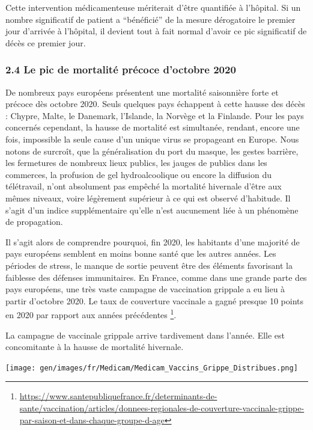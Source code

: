 \documentclass[
]{article}
\begin{document}
Cette intervention médicamenteuse mériterait d'être quantifiée à
l'hôpital. Si un nombre significatif de patient a ``bénéficié'' de la
mesure dérogatoire le premier jour d'arrivée à l'hôpital, il devient
tout à fait normal d'avoir ce pic significatif de décès ce premier jour.

\hypertarget{le-pic-de-mortalituxe9-pruxe9coce-doctobre-2020}{%
\subsubsection{2.4 Le pic de mortalité précoce d'octobre
2020}\label{le-pic-de-mortalituxe9-pruxe9coce-doctobre-2020}}

De nombreux pays européens présentent une mortalité saisonnière forte et
précoce dès octobre 2020. Seuls quelques pays échappent à cette hausse
des décès : Chypre, Malte, le Danemark, l'Islande, la Norvège et la
Finlande. Pour les pays concernés cependant, la hausse de mortalité est
simultanée, rendant, encore une fois, impossible la seule cause d'un
unique virus se propageant en Europe. Nous notons de surcroît, que la
généralisation du port du masque, les gestes barrière, les fermetures de
nombreux lieux publics, les jauges de publics dans les commerces, la
profusion de gel hydroalcoolique ou encore la diffusion du télétravail,
n'ont absolument pas empêché la mortalité hivernale d'être aux mêmes
niveaux, voire légèrement supérieur à ce qui est observé d'habitude. Il
s'agit d'un indice supplémentaire qu'elle n'est aucunement liée à un
phénomène de propagation.

Il s'agit alors de comprendre pourquoi, fin 2020, les habitants d'une
majorité de pays européens semblent en moins bonne santé que les autres
années. Les périodes de stress, le manque de sortie peuvent être des
éléments favorisant la faiblesse des défenses immunitaires. En France,
comme dans une grande parte des pays européens, une très vaste campagne
de vaccination grippale a eu lieu à partir d'octobre 2020. Le taux de
couverture vaccinale a gagné presque 10 points en 2020 par rapport aux
années précédentes \footnote{\url{https://www.santepubliquefrance.fr/determinants-de-sante/vaccination/articles/donnees-regionales-de-couverture-vaccinale-grippe-par-saison-et-dans-chaque-groupe-d-age}}.

La campagne de vaccinale grippale arrive tardivement dans l'année. Elle
est concomitante à la hausse de mortalité hivernale.

\texttt{[image: gen/images/fr/Medicam/Medicam\_Vaccins\_Grippe\_Distribues.png]}
\end{document}
